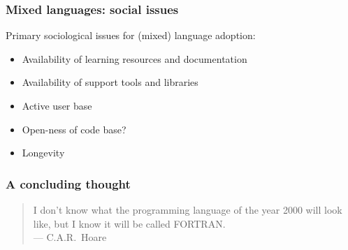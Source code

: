\documentclass{beamer}
\begin{document}
\begin{frame}
  \frametitle{Mixed languages: social issues}

  Primary sociological issues for (mixed) language adoption:
  \begin{itemize}
  \item Availability of learning resources and documentation
  \item Availability of support tools and libraries
  \item Active user base
  \item Open-ness of code base?
  \item Longevity
  \end{itemize}
\end{frame}


\begin{frame}
  \frametitle{A concluding thought}

  \begin{quote}
I don't know what the programming language of the year 2000 will look
like, but I know it will be called FORTRAN. \\
\hfill --- C.A.R.~Hoare
  \end{quote}
\end{frame}


\end{document}
